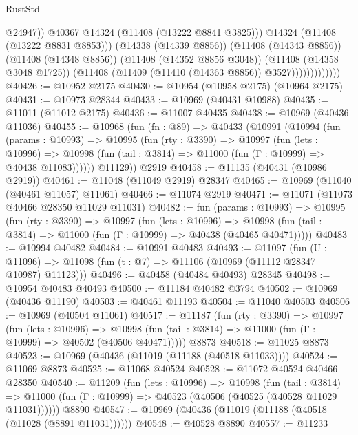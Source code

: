 \begin{lexlean}{RustStd}
\begin{coremodule}
                                  @24947))
                              @40367
                              @14324
                              (@11408 (@13222 @8841 @3825)))
                            @14324
                            (@11408 (@13222 @8831 @8853)))
                          (@14338 (@14339 @8856))
                          (@11408 (@14343 @8856))
                          (@11408 (@14348 @8856))
                          (@11408 (@14352 @8856 @3048))
                          (@11408 (@14358 @3048 @1725))
                          (@11408 (@11409 (@11410 (@14363 @8856)) @3527)))))))))))))
@40426 := @10952 @2175
@40430 := @10954 (@10958 @2175) (@10964 @2175)
@40431 := @10973 @28344
@40433 := @10969 (@40431 @10988)
@40435 := @11011 (@11012 @2175)
@40436 := @11007 @40435
@40438 := @10969 (@40436 @11036)
@40455 := @10968
    (fun (fn : @89) =>
    @40433
      (@10991
        (@10994
          (fun (params : @10993) =>
          @10995
            (fun (rty : @3390) =>
            @10997
              (fun (lets : @10996) =>
              @10998 (fun (tail : @3814) => @11000 (fun (Γ : @10999) => @40438 @11083))))))
        @11129))
    @2919
@40458 := @11135 (@40431 (@10986 @2919))
@40461 := @11048 (@11049 @2919) @28347
@40465 := @10969 (@11040 (@40461 @11057) @11061)
@40466 := @11074 @2919
@40471 := @11071 (@11073 @40466 @28350 @11029 @11031)
@40482 := fun (params : @10993) =>
  @10995
    (fun (rty : @3390) =>
    @10997
      (fun (lets : @10996) =>
      @10998 (fun (tail : @3814) => @11000 (fun (Γ : @10999) => @40438 (@40465 @40471)))))
@40483 := @10994 @40482
@40484 := @10991 @40483
@40493 := @11097
    (fun (U : @11096) => @11098 (fun (t : @7) => @11106 (@10969 (@11112 @28347 @10987) @11123)))
@40496 := @40458 (@40484 @40493) @28345
@40498 := @10954 @40483 @40493
@40500 := @11184 @40482 @3794
@40502 := @10969 (@40436 @11190)
@40503 := @40461 @11193
@40504 := @11040 @40503
@40506 := @10969 (@40504 @11061)
@40517 := @11187
    (fun (rty : @3390) =>
    @10997
      (fun (lets : @10996) =>
      @10998 (fun (tail : @3814) => @11000 (fun (Γ : @10999) => @40502 (@40506 @40471)))))
    @8873
@40518 := @11025 @8873
@40523 := @10969 (@40436 (@11019 (@11188 (@40518 @11033))))
@40524 := @11069 @8873
@40525 := @11068 @40524
@40528 := @11072 @40524 @40466 @28350
@40540 := @11209
    (fun (lets : @10996) =>
    @10998
      (fun (tail : @3814) =>
      @11000 (fun (Γ : @10999) => @40523 (@40506 (@40525 (@40528 @11029 @11031))))))
    @8890
@40547 := @10969 (@40436 (@11019 (@11188 (@40518 (@11028 (@8891 @11031))))))
@40548 := @40528 @8890
@40557 := @11233

\end{coremodule}
\end{lexlean}
